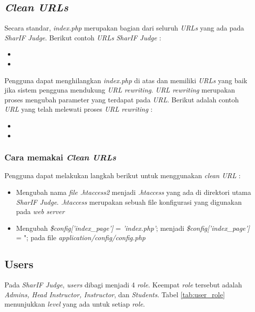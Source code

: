 \documentclass[a4paper,twoside]{article}
\begin{document}
\begin{enumerate}
		\subsection*{\textit{Clean URLs}}
		\label{subsec:clean_urls}
		Secara standar, \textit{index.php} merupakan bagian dari seluruh \textit{URLs} yang ada pada \textit{SharIF Judge}. Berikut contoh \textit{URLs} \textit{SharIF Judge} :
		
		\begin{itemize}
			\item {}
			\item {}
		\end{itemize}
		
		Pengguna dapat menghilangkan \textit{index.php} di atas dan memiliki \textit{URLs} yang baik jika sistem pengguna mendukung \textit{URL rewriting}. \textit{URL rewriting} merupakan proses mengubah parameter yang terdapat pada \textit{URL}. Berikut adalah contoh \textit{URL} yang telah melewati proses \textit{URL rewriting} :
		
		\begin{itemize}
			\item {}
			\item {}
		\end{itemize}
		
		\subsubsection*{Cara memakai \textit{Clean URLs}}
		\label{subsubsec:clean_urls}
		Pengguna dapat melakukan langkah berikut untuk menggunakan \textit{clean URL} :
		\begin{itemize}
			\item Mengubah nama \textit{file .htaccess2} menjadi \textit{.htaccess} yang ada di direktori utama \textit{SharIF Judge}. \textit{.htaccess} merupakan sebuah file konfigurasi yang digunakan pada \textit{web server}
			\item Mengubah \textit{\$config['index\_page']} = \textit{'index.php'}; menjadi\textit{ \$config['index\_page']} = "; pada file \textit{application/config/config.php}
		\end{itemize} 
		
		\subsection*{Users}
		\label{subsec:users}
		Pada \textit{SharIF Judge}, \textit{users} dibagi menjadi 4 \textit{role}. Keempat \textit{role} tersebut adalah \textit{Admins, Head Instructor, Instructor}, dan \textit{Students}. Tabel \ref{tab:user_role} menunjukkan \textit{level} yang ada untuk setiap \textit{role}.
		

\end{enumerate}
\end{document}
